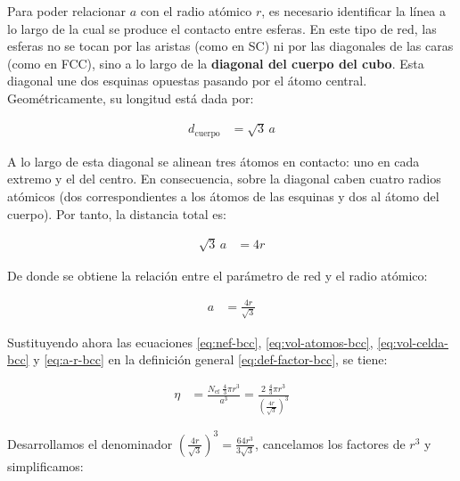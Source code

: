 \documentclass{article}
\begin{document}
Para poder relacionar \(a\) con el radio atómico \(r\), es necesario identificar la línea a lo largo de la cual se produce el contacto entre esferas.  
En este tipo de red, las esferas no se tocan por las aristas (como en SC) ni por las diagonales de las caras (como en FCC), sino a lo largo de la \textbf{diagonal del cuerpo del cubo}.  
Esta diagonal une dos esquinas opuestas pasando por el átomo central.  
Geométricamente, su longitud está dada por:

\begin{equation}
\begin{split}
d_{\text{cuerpo}} &= \sqrt{3}\,a
\end{split} \label{eq:diag-cuerpo}
\end{equation}

A lo largo de esta diagonal se alinean tres átomos en contacto: uno en cada extremo y el del centro.  
En consecuencia, sobre la diagonal caben cuatro radios atómicos (dos correspondientes a los átomos de las esquinas y dos al átomo del cuerpo).  
Por tanto, la distancia total es:

\begin{equation}
\begin{split}
\sqrt{3}\,a &= 4r
\end{split} \label{eq:contacto-bcc}
\end{equation}

De donde se obtiene la relación entre el parámetro de red y el radio atómico:

\begin{equation}
\begin{split}
a &= \frac{4r}{\sqrt{3}}
\end{split} \label{eq:a-r-bcc}
\end{equation}

Sustituyendo ahora las ecuaciones \eqref{eq:nef-bcc}, \eqref{eq:vol-atomos-bcc}, \eqref{eq:vol-celda-bcc} y \eqref{eq:a-r-bcc} en la definición general \eqref{eq:def-factor-bcc}, se tiene:

\begin{equation}
\begin{split}
\eta &= \frac{N_{\text{ef}}\;\frac{4}{3}\pi r^{3}}{a^{3}}
     = \frac{2\;\frac{4}{3}\pi r^{3}}{\left(\frac{4r}{\sqrt{3}}\right)^{3}}
\end{split} \label{eq:eta-bcc-1}
\end{equation}

Desarrollamos el denominador \(\left(\tfrac{4r}{\sqrt{3}}\right)^{3}=\tfrac{64r^{3}}{3\sqrt{3}}\), cancelamos los factores de \(r^{3}\) y simplificamos:
\end{document}
